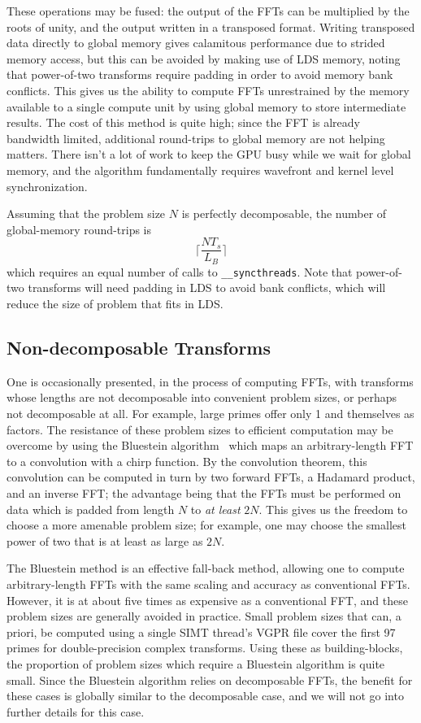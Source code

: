 \documentclass[blind]{gtac}
\begin{document}
These operations may be fused: the output of the FFTs can be
multiplied by the roots of unity, and the output written in a
transposed format.  Writing transposed data directly to global memory
gives calamitous performance due to strided memory access, but this
can be avoided by making use of LDS memory, noting that power-of-two
transforms require padding in order to avoid memory bank conflicts.
This gives us the ability to compute FFTs unrestrained by the memory
available to a single compute unit by using global memory to store
intermediate results.  The cost of this method is quite high; since
the FFT is already bandwidth limited, additional round-trips to global
memory are not helping matters.  There isn't a lot of work to keep the
GPU busy while we wait for global memory, and the algorithm
fundamentally requires wavefront and kernel level synchronization.

Assuming that the problem size $N$ is perfectly decomposable, the
number of global-memory round-trips is
\begin{dmath}
  \lceil  \frac{N T_s}{L_B} \rceil
\end{dmath}
which requires an equal number of calls to \texttt{__syncthreads}.
Note that power-of-two transforms will need padding in LDS to avoid
bank conflicts, which will reduce the size of problem that fits in
LDS.

\subsection{Non-decomposable Transforms}

One is occasionally presented, in the process of computing FFTs, with
transforms whose lengths are not decomposable into convenient problem
sizes, or perhaps not decomposable at all. For example, large primes
offer only 1 and themselves as factors.  The resistance of these
problem sizes to efficient computation may be overcome by using the
Bluestein algorithm~\cite{bluestein1970linear} which maps an
arbitrary-length FFT to a convolution with a chirp function.  By the
convolution theorem, this convolution can be computed in turn by two
forward FFTs, a Hadamard product, and an inverse FFT; the advantage
being that the FFTs must be performed on data which is padded from
length $N$ to \emph{at least} $2N$.  This gives us the freedom to
choose a more amenable problem size; for example, one may choose the
smallest power of two that is at least as large as $2N$.

The Bluestein method is an effective fall-back method, allowing one to
compute arbitrary-length FFTs with the same scaling and accuracy as
conventional FFTs.  However, it is at about five times as expensive as
a conventional FFT, and these problem sizes are generally avoided in
practice.  Small problem sizes that can, a priori, be computed using a
single SIMT thread's VGPR file cover the first 97 primes for
double-precision complex transforms.  Using these as building-blocks,
the proportion of problem sizes which require a Bluestein algorithm is
quite small.  Since the Bluestein algorithm relies on decomposable
FFTs, the benefit for these cases is globally similar to the
decomposable case, and we will not go into further details for this
case.
\end{document}
